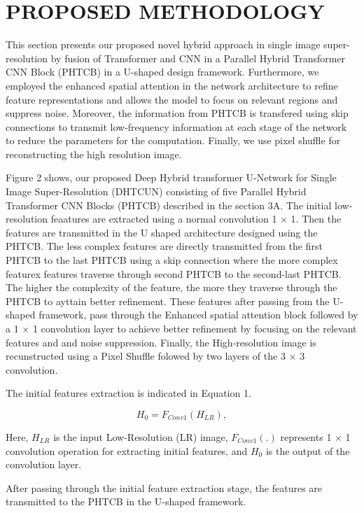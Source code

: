 \documentclass{ieeeaccess}
\begin{document}
\section{PROPOSED METHODOLOGY}

This section presents our proposed novel hybrid approach in single image super-resolution by fusion of Transformer and CNN in a Parallel Hybrid Transformer CNN Block (PHTCB) in a U-shaped design framework. Furthermore, we employed the enhanced spatial attention in the network architecture to refine feature representations and allows the model to focus on relevant regions and suppress noise. Moreover, the information from PHTCB is transfered using skip connections to transmit low-frequency information at each stage of the network to reduce the parameters for the computation. Finally, we use pixel shuffle for reconstructing the high resolution image.

Figure 2 shows, our proposed Deep Hybrid transformer U-Network for Single Image Super-Resolution (DHTCUN) consisting of five Parallel Hybrid Transformer CNN Blocks (PHTCB) described in the section 3A. The initial low-resolution feaatures are extracted using a normal convolution 1 $\times$ 1. Then the features are transmitted in the U shaped architecture designed using the PHTCB. The less complex features are directly transmitted from the first PHTCB to the last PHTCB using a skip connection where the more complex featurex features traverse through second PHTCB to the second-last PHTCB. The higher the complexity of the feature, the more they traverse through the PHTCB to ayttain better refinement. These features after passing from the U-shaped framework, pass through the Enhanced spatial attention block followed by a 1 $\times$ 1 convolution layer to achieve better refinement  by focusing on the relevant features and and noise suppression. Finally, the High-resolution image is recunstructed using a Pixel Shuffle folowed by two layers of the 3 $\times$ 3 convolution.

The initial features extraction is indicated in Equation 1.

\begin{equation}
{H_{0}}= {F_{Conv1}}({H_{LR}}),
\end{equation}

Here, ${H_{LR}}$ is the input Low-Resolution (LR) image, ${F_{Conv1}}$$(.)$ represents 1 $\times$ 1 convolution operation for extracting initial features, and ${H_{0}}$ is the output of the convolution layer. 

After passing through the initial feature extraction stage, the features are transmitted to the PHTCB in the U-shaped framework.
\end{document}
